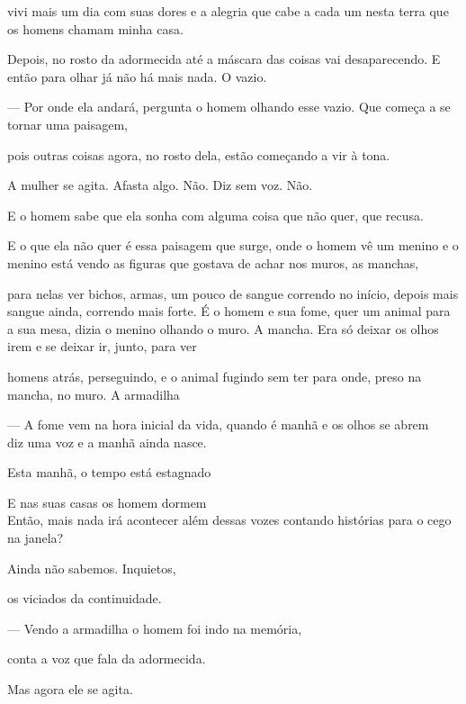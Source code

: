 vivi mais um dia com suas dores e a alegria que cabe a cada um nesta
terra que os homens chamam minha casa.

Depois, no rosto da adormecida até a máscara das coisas vai
desaparecendo. E então para olhar já não há mais nada. O vazio.

--- Por onde ela andará, pergunta o homem olhando esse vazio. Que começa a
se tornar uma paisagem,

pois outras coisas agora, no rosto dela, estão começando a vir à tona.

A mulher se agita. Afasta algo. Não. Diz sem voz. Não.

E o homem sabe que ela sonha com alguma coisa que não quer, que recusa.

E o que ela não quer é essa paisagem que surge, onde o homem vê um
menino e o menino está vendo as figuras que gostava de achar nos muros,
as manchas,

para nelas ver bichos, armas, um pouco de sangue correndo no início,
depois mais sangue ainda, correndo mais forte. É o homem e sua fome,
quer um animal para a sua mesa, dizia o menino olhando o muro. A mancha.
Era só deixar os olhos irem e se deixar ir, junto, para ver

homens atrás, perseguindo, e o animal fugindo sem ter para onde, preso
na mancha, no muro. A armadilha

\breakk

\vspace*{4cm}

--- A fome vem na hora inicial da vida, quando é manhã e os olhos se abrem\\

diz uma voz e a manhã ainda nasce.

Esta manhã, o tempo está estagnado

E nas suas casas os homem dormem\\

Então, mais nada irá acontecer além dessas vozes contando histórias para
o cego na janela?

Ainda não sabemos. Inquietos,

os viciados da continuidade.

\breakk

\vspace*{4cm}

--- Vendo a armadilha o homem foi indo na memória,

conta a voz que fala da adormecida.

Mas agora ele se agita.

